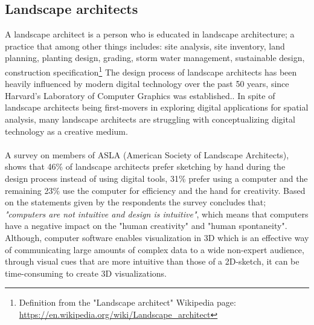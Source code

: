  	\subsection{Landscape architects}\label{whoSaysSo}
 	A landscape architect is a person who is educated in landscape architecture; a practice that among other things includes: site analysis, site inventory, land planning, planting design, grading, storm water management, sustainable design, construction specification\footnote{Definition from the "Landscape architect" Wikipedia page: \url{https://en.wikipedia.org/wiki/Landscape\_architect}}
 	The design process of landscape architects has been heavily influenced by modern digital technology over the past 50 years, since Harvard's Laboratory of Computer Graphics was established.\cite{landscapeArchitectureDigiTech}. In spite of landscape architects being first-movers in exploring digital applications for spatial analysis, many landscape architects are struggling with conceptualizing digital technology as a creative medium\cite{landscapeArchitectureDigiTech}. \\
 	\\
 	A survey on members of ASLA (American Society of Landscape Architects)\cite{surveySketchVSDigital}, shows that 46\% of landscape architects prefer sketching by hand during the design process instead of using digital tools, 31\% prefer using a computer and the remaining 23\% use the computer for efficiency and the hand for creativity. 
 	Based on the statements given by the respondents the survey concludes that; \textit{"computers are not intuitive and design is intuitive"}, which means that computers have a negative impact on the "human creativity" and "human spontaneity"\cite{landscapeArchitectureDigiTech}\cite{surveySketchVSDigital}. Although, computer software enables visualization in 3D which is an effective way of communicating large amounts of complex data to a wide non-expert audience, through visual cues that are more intuitive than those of a 2D-sketch, it can be time-consuming to create 3D visualizations\cite{landscapeVisual}.
		
